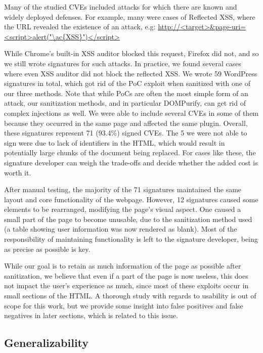 Many of the studied CVEs included attacks for which there are known and widely deployed defenses. For example, many were cases of Reflected \ac{XSS}, where the URL revealed the existence of an attack, e.g: \url{http://<target>&page-uri=<script>alert("\ac{XSS}")</script>}

While Chrome's built-in \ac{XSS} auditor blocked this request, Firefox did not, and so we still wrote signatures for such attacks. In practice, we found several cases where even XSS auditor did not block the reflected XSS. We wrote 59 WordPress signatures in total, which got rid of the PoC exploit when sanitized with one of our three methods. Note that while PoCs are often the most simple form of an attack, our sanitization methods, and in particular DOMPurify, can get rid of complex injections as well. We were able to include several CVEs in some of them because they occurred in the same page and affected the same plugin. Overall, these signatures represent 71 (93.4\%) signed CVEs. The 5 we were not able to sign were due to lack of identifiers in the HTML, which would result in potentially large chunks of the document being replaced. For cases like these, the signature developer can weigh the trade-offs and decide whether the added cost is worth it.

After manual testing, the majority of the 71 signatures maintained the same layout and core functionality of the webpage. However, 12 signatures caused some elements to be rearranged, modifying the page's visual aspect. One caused a small part of the page to become unusable, due to the sanitization method used (a table showing user information was now rendered as blank). Most of the responsibility of maintaining functionality is left to the signature developer, being as precise as possible is key.

While our goal is to retain as much information of the page as possible after sanitization, we believe that even if a part of the page is now useless, this does not impact the user's experience as much, since most of these exploits occur in small sections of the HTML. A thorough study with regards to usability is out of scope for this work, but we provide some insight into false positives and false negatives in later sections, which is related to this issue.

\subsection{Generalizability} \label{generalizability}

